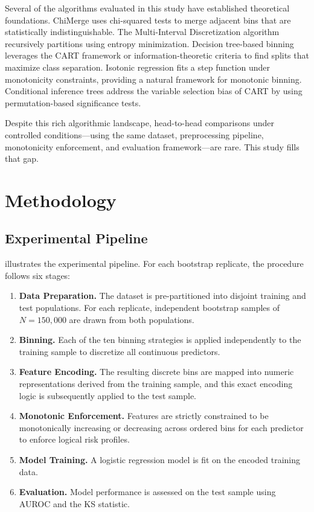 \documentclass[11pt]{article}
\begin{document}
Several of the algorithms evaluated in this study have established theoretical foundations. ChiMerge \citep{kerber1992chimerge} uses chi-squared tests to merge adjacent bins that are statistically indistinguishable. The Multi-Interval Discretization algorithm \citep{fayyad1993multi} recursively partitions using entropy minimization. Decision tree-based binning leverages the CART framework \citep{breiman1984cart} or information-theoretic criteria \citep{quinlan1986induction} to find splits that maximize class separation. Isotonic regression \citep{barlow1972isotonic} fits a step function under monotonicity constraints, providing a natural framework for monotonic binning. Conditional inference trees \citep{hothorn2006unbiased} address the variable selection bias of CART by using permutation-based significance tests.

Despite this rich algorithmic landscape, head-to-head comparisons under controlled conditions---using the same dataset, preprocessing pipeline, monotonicity enforcement, and evaluation framework---are rare. This study fills that gap.


\section{Methodology}
\label{sec:method}

\subsection{Experimental Pipeline}

 illustrates the experimental pipeline. For each bootstrap replicate, the procedure follows six stages:

\begin{enumerate}[nosep]
    \item \textbf{Data Preparation.} The dataset is pre-partitioned into disjoint training and test populations. For each replicate, independent bootstrap samples of $N=150{,}000$ are drawn from both populations.
    \item \textbf{Binning.} Each of the ten binning strategies is applied independently to the training sample to discretize all continuous predictors.
    \item \textbf{Feature Encoding.} The resulting discrete bins are mapped into numeric representations derived from the training sample, and this exact encoding logic is subsequently applied to the test sample.
    \item \textbf{Monotonic Enforcement.} Features are strictly constrained to be monotonically increasing or decreasing across ordered bins for each predictor to enforce logical risk profiles.
    \item \textbf{Model Training.} A logistic regression model is fit on the encoded training data.
    \item \textbf{Evaluation.} Model performance is assessed on the test sample using AUROC and the KS statistic.
\end{enumerate}
\end{document}
